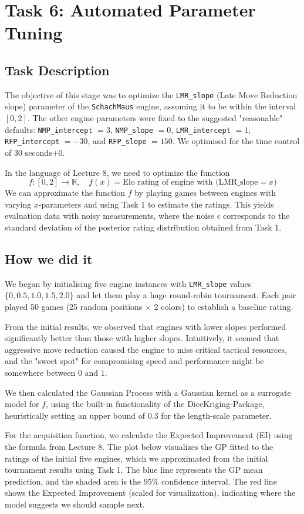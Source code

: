 \section{Task 6: Automated Parameter Tuning}

\subsection{Task Description}
The objective of this stage was to optimize the \texttt{LMR\_slope} (Late Move Reduction slope) parameter of the \texttt{SchachMaus} engine, assuming it to be within the interval $[0, 2]$. The other engine parameters were fixed to the suggested "reasonable" defaults: \texttt{NMP\_intercept} $= 3$, \texttt{NMP\_slope} $= 0$, \texttt{LMR\_intercept} $= 1$, \texttt{RFP\_intercept} $= -30$, and \texttt{RFP\_slope} $= 150$. We optimised for the time control of $30$ seconds$+0$.
\par In the language of Lecture 8, we need to optimize the function
\[
f: [0,2] \to \mathbb{R}, \quad f(x) = \text{Elo rating of engine with (LMR\_slope} = x\text{)}
\]
We can approximate the function $f$ by playing games between engines with varying $x$-parameters and using Task 1 to estimate the ratings. This yields evaluation data with noisy measurements, where the noise $\epsilon$ corresponds to the standard deviation of the posterior rating distribution obtained from Task 1. 

\subsection{How we did it}
We began by initialising five engine instances with \texttt{LMR\_slope} values $\{0, 0.5, 1.0, 1.5, 2.0\}$ and let them play a huge round-robin tournament. Each pair played 50 games (25 random positions $\times$ 2 colors) to establish a baseline rating.
\par From the initial results, we observed that engines with lower slopes performed significantly better than those with higher slopes. Intuitively, it seemed that aggressive move reduction caused the engine to miss critical tactical resources, and the "sweet spot" for compromising speed and performance might be somewhere between $0$ and $1$.
\par We then calculated the Gaussian Process with a Gaussian kernel as a surrogate model for $f$, using the built-in functionality of the DiceKriging-Package, heuristically setting an upper bound of $0.3$ for the length-scale parameter.
\par For the acquisition function, we calculate the Expected Improvement (EI) using the formula from Lecture 8. The plot below visualizes the GP fitted to the ratings of the initial five engines, which we approximated from the initial tournament results using Task 1. The blue line represents the GP mean prediction, and the shaded area is the $95\%$ confidence interval. The red line shows the Expected Improvement (scaled for visualization), indicating where the model suggests we should sample next.

